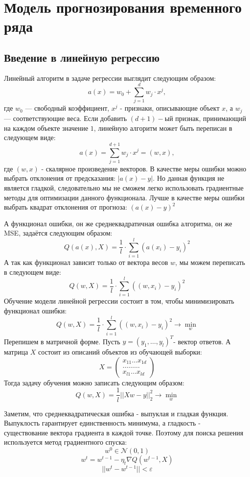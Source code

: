 \documentclass[14pt, a4paper]{extarticle}
\begin{document}
	\section{Модель прогнозирования временного ряда}	
	\subsection{Введение в линейную регрессию}	
	Линейный алгоритм в задаче регрессии выглядит следующим образом:
	$$a(x) = w_0 + \sum_{j=1}^{d}w_j \cdot x^j,$$ 
	где $w_0$ — свободный коэффициент, $x^j$ - признаки, описывающие объект $x$, а $w_j$ — соответствующие веса. Если добавить $(d+1)-$ый признак, принимающий на каждом объекте значение $1$, линейную алгоритм может быть переписан в следующем виде: 
	$$a(x) = \sum_{j=1}^{d+1}w_j \cdot x^j = (w,x),$$ 
	где $(w,x)$ - скалярное произведение векторов. В качестве меры ошибки можно выбрать отклонения от предсказания: $|a(x)-y|$. Но данная функция не является гладкой, следовательно мы не сможем легко использовать градиентные методы для оптимизации данного функционала. Лучше в качестве меры ошибки выбрать квадрат отклонения от прогноза: $(a(x)-y)^2$
	
	А функционал ошибки, он же среднеквадратичная ошибка алгоритма, он же MSE, задаётся следующим образом:
	$$Q(a(x), X) = \dfrac{1}{l} \cdot \sum_{i=1}^{l} (a(x_i)- y_i)^2$$
	А так как функционал зависит только от вектора весов $w$, мы можем переписать в следующем виде:
	$$Q(w, X) = \dfrac{1}{l} \cdot \sum_{i=1}^{l} ((w,x_i)- y_i)^2$$
	Обучение модели линейной регрессии состоит в том, чтобы минимизировать функционал ошибки:
	$$Q(w, X) = \dfrac{1}{l} \cdot \sum_{i=1}^{l} ((w,x_i)- y_i)^2\longrightarrow \min_{w}$$
	Перепишем в матричной форме. Пусть $y = (y_1, \dots, y_l)^T $- вектор ответов. А матрица $X$ состоит из описаний объектов из обучающей выборки:
	$$X = 
\begin{pmatrix}
  x_{11} \dots x_{1d}\\
  \dots \dots \dots\\
  x_{l1} \dots x_{ld}
\end{pmatrix}
$$
Тогда задачу обучения можно записать следующим образом:
$$Q(w, X) = \dfrac{1}{l}||Xw-y||_2^2\longrightarrow \min_{w}$$

Заметим, что  среднеквадратическая ошибка - выпуклая и гладкая функция. Выпуклость гарантирует единственность  минимума, а гладкость - \\ существование вектора градиента в каждой точке. Поэтому для поиска решения используется метод градиентного спуска: 
$$w^0\in \mathcal {N}(0,1)$$
 $$w^t = w^{t-1}-\eta_t \nabla Q(w^{t-1},X)$$
$$||w^t-w^{t-1}||<\varepsilon$$
\end{document}

